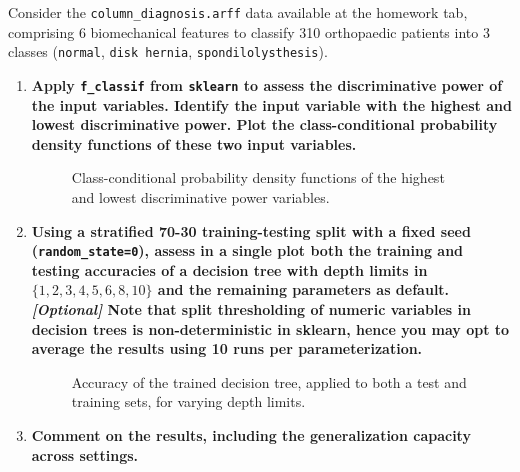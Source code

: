 \documentclass[12pt]{article}
\begin{document}
\noindent Consider the \texttt{column\_diagnosis.arff} data available at the homework tab, comprising 6 biomechanical
features to classify 310 orthopaedic patients into 3 classes (\texttt{normal}, \texttt{disk hernia}, \texttt{spondilolysthesis}).

\begin{enumerate}[leftmargin=\labelsep]
    \item \textbf{Apply \texttt{f\_classif} from \texttt{sklearn} to assess the discriminative power of the input variables.
          Identify the input variable with the highest and lowest discriminative power.
          Plot the class-conditional probability density functions of these two input variables.}

          \vskip 0.3cm
          

          \vskip -0.7cm
          \begin{figure}[H]
              \centering
              
              \caption{Class-conditional probability density functions of the highest and lowest discriminative power variables.}
              \label{fig:PartII-ex1-plot}
          \end{figure}

    \item \textbf{Using a stratified 70-30 training-testing split with a fixed seed (\texttt{random\_state=0}), assess in a
          single plot both the training and testing accuracies of a decision tree with depth limits in
          $\{1,2,3,4,5,6,8,10\}$ and the remaining parameters as default.\vskip 0.05cm
          \textit{[Optional]} Note that split thresholding of numeric variables in decision trees is non-deterministic
          in sklearn, hence you may opt to average the results using 10 runs per parameterization.}

          \vskip 0.3cm
          

          \vskip -0.7cm
          \begin{figure}[H]
              \centering
              
              \caption{Accuracy of the trained decision tree, applied to both a test and training sets, for varying depth limits.}
              \label{fig:PartII-ex2-plot}
          \end{figure}

    \item \textbf{Comment on the results, including the generalization capacity across settings.}


\end{enumerate}
\end{document}
